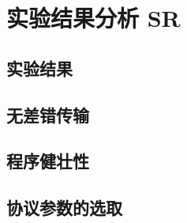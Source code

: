 \section{实验结果分析 SR}
    \subsection{实验结果}


    \subsection{无差错传输}

    \subsection{程序健壮性}

    \subsection{协议参数的选取}

    